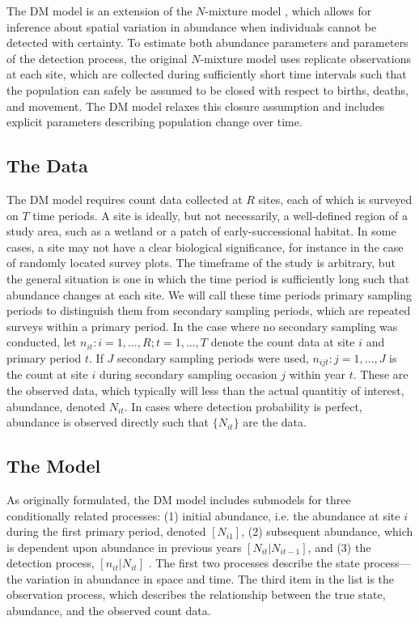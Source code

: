 \documentclass[12pt]{article}
\begin{document}
The DM model is an extension of the $N$-mixture model
\citep{royle:2004biom}, which allows for inference about spatial
variation in abundance when individuals cannot be detected with
certainty. To estimate both abundance parameters and parameters of the
detection process, the original $N$-mixture model uses replicate
observations at each site, which are collected during sufficiently
short time intervals such that the population can safely be assumed to
be closed with respect to births, deaths, and movement. The DM model
relaxes this closure assumption and includes explicit parameters
describing population change over time.


\subsection{The Data}

The DM model requires count data collected at $R$ sites, each of which
is surveyed on $T$ time periods. A site is ideally, but not necessarily, a
well-defined region of a study area, such as a wetland or a patch of
early-successional habitat. In some cases, a site may not have a clear
biological significance, for instance in the case of randomly located
survey plots. The timeframe of the study is arbitrary, but the general
situation is one in which the time period is sufficiently long such
that abundance changes at each site. We will call
these time periods primary sampling periods to distinguish them from
secondary sampling periods, which are repeated surveys within a
primary period. In the case where no secondary sampling was conducted,
let $n_{it}: i=1,\hdots,R; t=1,\hdots,T$ denote the count data at site
$i$ and primary period $t$. If $J$ secondary sampling periods were used, $n_{ijt}:
j=1,\hdots,J$ is the count at site $i$ during secondary sampling
occasion $j$ within year $t$. These are the observed data, which
typically will less than the actual quantitiy of interest, abundance,
denoted $N_{it}$. In cases where detection probability is perfect,
abundance is observed directly such that $\{N_{it}\}$ are the data.

\subsection{The Model}

As originally formulated, the DM model includes submodels for three
conditionally related processes: (1) initial abundance, i.e. the
abundance at site $i$ during the first primary period,
denoted $[N_{i1}]$, (2) subsequent abundance, which is dependent upon
abundance in previous years $[N_{it}|N_{it-1}]$, and (3) the
detection process, $[n_{it}|N_{it}]$ \citep{dail_madsen:2011}.
The first two processes describe the state process---the
variation in abundance in space and time. The third item in the list
is the observation process, which describes the relationship between
the true state, abundance, and the observed count data.
\end{document}
